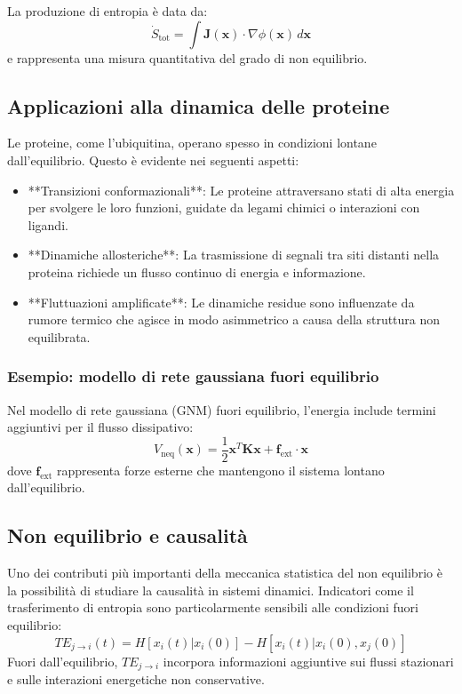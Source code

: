 \documentclass[Lau,binding=0.6cm,oneside,noexaminfo]{sapthesis}
\begin{document}
La produzione di entropia è data da:
\[
\dot{S}_\text{tot} = \int \mathbf{J}(\mathbf{x}) \cdot \nabla \phi(\mathbf{x}) \, d\mathbf{x}
\]
e rappresenta una misura quantitativa del grado di non equilibrio.

\subsection{Applicazioni alla dinamica delle proteine}
Le proteine, come l'ubiquitina, operano spesso in condizioni lontane dall'equilibrio. Questo è evidente nei seguenti aspetti:
\begin{itemize}
    \item **Transizioni conformazionali**: Le proteine attraversano stati di alta energia per svolgere le loro funzioni, guidate da legami chimici o interazioni con ligandi.
    \item **Dinamiche allosteriche**: La trasmissione di segnali tra siti distanti nella proteina richiede un flusso continuo di energia e informazione.
    \item **Fluttuazioni amplificate**: Le dinamiche residue sono influenzate da rumore termico che agisce in modo asimmetrico a causa della struttura non equilibrata.
\end{itemize}

\subsubsection{Esempio: modello di rete gaussiana fuori equilibrio}
Nel modello di rete gaussiana (GNM) fuori equilibrio, l'energia include termini aggiuntivi per il flusso dissipativo:
\[
V_\text{neq}(\mathbf{x}) = \frac{1}{2} \mathbf{x}^T \mathbf{K} \mathbf{x} + \mathbf{f}_\text{ext} \cdot \mathbf{x}
\]
dove \( \mathbf{f}_\text{ext} \) rappresenta forze esterne che mantengono il sistema lontano dall'equilibrio.

\subsection{Non equilibrio e causalità}
Uno dei contributi più importanti della meccanica statistica del non equilibrio è la possibilità di studiare la causalità in sistemi dinamici. Indicatori come il trasferimento di entropia sono particolarmente sensibili alle condizioni fuori equilibrio:
\[
TE_{j \to i}(t) = H[x_i(t) | x_i(0)] - H[x_i(t) | x_i(0), x_j(0)]
\]
Fuori dall'equilibrio, \( TE_{j \to i} \) incorpora informazioni aggiuntive sui flussi stazionari e sulle interazioni energetiche non conservative.
\end{document}
